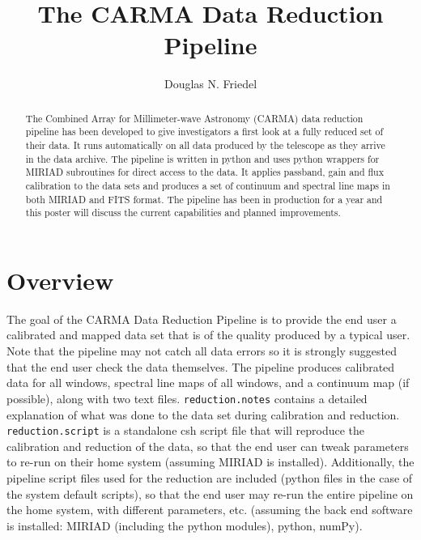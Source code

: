 
\resetcounters


\title{The CARMA Data Reduction Pipeline}
\author{Douglas N. Friedel}


\begin{abstract}
The Combined Array for Millimeter-wave Astronomy (CARMA) data reduction pipeline has been developed to give investigators a first look at a fully reduced set of their data. It runs automatically on all data produced by the telescope as they arrive in the data archive. The pipeline is written in python and uses python wrappers for MIRIAD subroutines for direct access to the data. It applies passband, gain and flux calibration to the data sets and produces a set of continuum and spectral line maps in both MIRIAD and FITS format. The pipeline has been in production for a year and this poster will discuss the current capabilities and planned improvements.
\end{abstract}

\section{Overview}

The goal of the CARMA Data Reduction Pipeline is to provide the end user a calibrated and mapped data set that is of the quality produced by a typical user. Note that the pipeline may not catch all data errors so it is strongly suggested that the end user check the data themselves. The pipeline produces calibrated data for all windows, spectral line maps of all windows, and a continuum map (if possible), along with two text files. \verb#reduction.notes# contains a detailed explanation of what was done to the data set during calibration and reduction. \verb#reduction.script# is a standalone csh script file that will reproduce the calibration and reduction of the data, so that the end user can tweak parameters to re-run on their home system (assuming MIRIAD is installed). Additionally, the pipeline script files used for the reduction are included (python files in the case of the system default scripts), so that the end user may re-run the entire pipeline on the home system, with different parameters, etc. (assuming the back end software is installed: MIRIAD (including the python modules), python, numPy).

